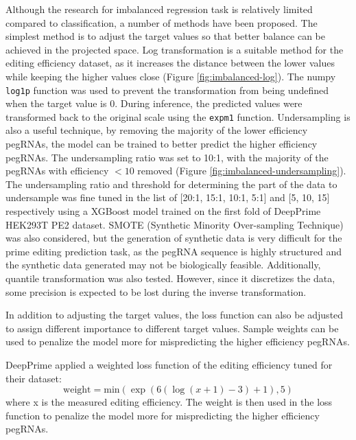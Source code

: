 Although the research for imbalanced regression task is relatively limited compared to classification, a number of methods have been proposed\cite{krawczykLearningImbalancedData2016}. The simplest method is to adjust the target values so that better balance can be achieved in the projected space. Log transformation is a suitable method for the editing efficiency dataset, as it increases the distance between the lower values while keeping the higher values close (Figure \ref{fig:imbalanced-log}). The numpy \verb|log1p| function was used to prevent the transformation from being undefined when the target value is 0. During inference, the predicted values were transformed back to the original scale using the \verb|expm1| function. Undersampling is also a useful technique, by removing the majority of the lower efficiency pegRNAs, the model can be trained to better predict the higher efficiency pegRNAs\cite{torgoResamplingStrategiesRegression2015}. 
The undersampling ratio was set to 10:1, with the majority of the pegRNAs with efficiency $<10$ removed (Figure \ref{fig:imbalanced-undersampling}). The undersampling ratio and threshold for determining the part of the data to undersample was fine tuned in the list of [20:1, 15:1, 10:1, 5:1] and [5, 10, 15] respectively using a XGBoost model trained on the first fold of DeepPrime HEK293T PE2 dataset. 
SMOTE (Synthetic Minority Over-sampling Technique) was also considered, but the generation of synthetic data is very difficult for the prime editing prediction task, as the pegRNA sequence is highly structured and the synthetic data generated may not be biologically feasible. Additionally, quantile transformation was also tested. However, since it discretizes the data, some precision is expected to be lost during the inverse transformation.

In addition to adjusting the target values, the loss function can also be adjusted to assign different importance to different target values. Sample weights can be used to penalize the model more for mispredicting the higher efficiency pegRNAs. 

DeepPrime applied a weighted loss function of the editing efficiency tuned for their dataset:
\begin{equation}
    \text{weight} = \text{min}(\exp(6(\log(x+1)-3)+1),5)
\end{equation}
where x is the measured editing efficiency. The weight is then used in the loss function to penalize the model more for mispredicting the higher efficiency pegRNAs.

